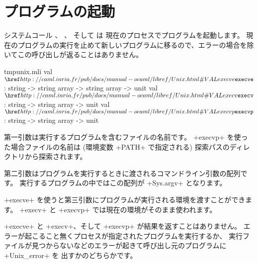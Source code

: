 \medskip

\section{プログラムの起動}

システムコール 、 、 そして  は
現在のプロセスでプログラムを起動します。
現在のプログラムの実行を止めて新しいプログラムに移るので、エラーの場合を除いてこの呼び出しが返ることはありません。
%
\begin{listingcodefile}{tmpunix.mli}
val $\libvalue{Unix}{execve}$ : string -> string array -> string array -> unit
val $\libvalue{Unix}{execv}$  : string -> string array -> unit
val $\libvalue{Unix}{execvp}$ : string -> string array -> unit
\end{listingcodefile}
%
第一引数は実行するプログラムを含むファイルの名前です。
\ml+execvp+ を使った場合ファイルの名前は (環境変数 \ml+PATH+ で指定される) 探索パスのディレクトリから探索されます。

第二引数はプログラムを実行するときに渡されるコマンドライン引数の配列です。
実行するプログラムの中ではこの配列が \ml+Sys.argv+ となります。

\ml+execve+ を使うと第三引数にプログラムが実行される環境を渡すことができます。
\ml+execv+ と \ml+execvp+ では現在の環境がそのまま使われます。

\ml+execve+ と \ml+execv+、そして \ml+execvp+ が結果を返すことはありません。
エラーが起こること無くプロセスが指定されたプログラムを実行するか、
実行ファイルが見つからないなどのエラーが起きて呼び出し元のプログラムに \ml+Unix_error+ を
出すかのどちらかです。

